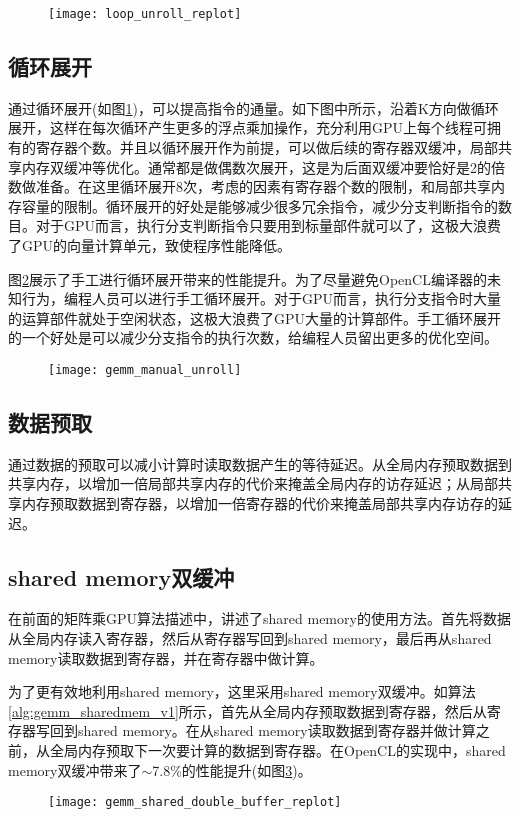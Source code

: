 \begin{figure}[htbp]
	\centering
	\texttt{[image: loop\_unroll\_replot]}
	\label{fig:loop_unroll_replot}
\end{figure}
\subsection{循环展开}
通过循环展开(如图\ref{fig:loop_unroll_replot})，可以提高指令的通量。如下图中所示，沿着K方向做循环展开，这样在每次循环产生更多的浮点乘加操作，充分利用GPU上每个线程可拥有的寄存器个数。并且以循环展开作为前提，可以做后续的寄存器双缓冲，局部共享内存双缓冲等优化。通常都是做偶数次展开，这是为后面双缓冲要恰好是2的倍数做准备。在这里循环展开8次，考虑的因素有寄存器个数的限制，和局部共享内存容量的限制。循环展开的好处是能够减少很多冗余指令，减少分支判断指令的数目。对于GPU而言，执行分支判断指令只要用到标量部件就可以了，这极大浪费了GPU的向量计算单元，致使程序性能降低。

图\ref{fig:gemm_manual_unroll}展示了手工进行循环展开带来的性能提升。为了尽量避免OpenCL编译器的未知行为，编程人员可以进行手工循环展开。对于GPU而言，执行分支指令时大量的运算部件就处于空闲状态，这极大浪费了GPU大量的计算部件。手工循环展开的一个好处是可以减少分支指令的执行次数，给编程人员留出更多的优化空间。
\begin{figure}[htbp]
	\centering
	\texttt{[image: gemm\_manual\_unroll]}
	\label{fig:gemm_manual_unroll}
\end{figure}
\subsection{数据预取}
通过数据的预取可以减小计算时读取数据产生的等待延迟。从全局内存预取数据到共享内存，以增加一倍局部共享内存的代价来掩盖全局内存的访存延迟；从局部共享内存预取数据到寄存器，以增加一倍寄存器的代价来掩盖局部共享内存访存的延迟。

\subsection{shared memory双缓冲}
在前面的矩阵乘GPU算法描述中，讲述了shared memory的使用方法。首先将数据从全局内存读入寄存器，然后从寄存器写回到shared memory，最后再从shared memory读取数据到寄存器，并在寄存器中做计算。

为了更有效地利用shared memory，这里采用shared memory双缓冲。如算法\ref{alg:gemm_sharedmem_v1}所示，首先从全局内存预取数据到寄存器，然后从寄存器写回到shared memory。在从shared memory读取数据到寄存器并做计算之前，从全局内存预取下一次要计算的数据到寄存器。在OpenCL的实现中，shared memory双缓冲带来了$\sim$7.8\%的性能提升(如图\ref{fig:gemm_shared_double_buffer_replot})。
\begin{figure}[htbp]
	\centering
	\texttt{[image: gemm\_shared\_double\_buffer\_replot]}
	\label{fig:gemm_shared_double_buffer_replot}
\end{figure}

